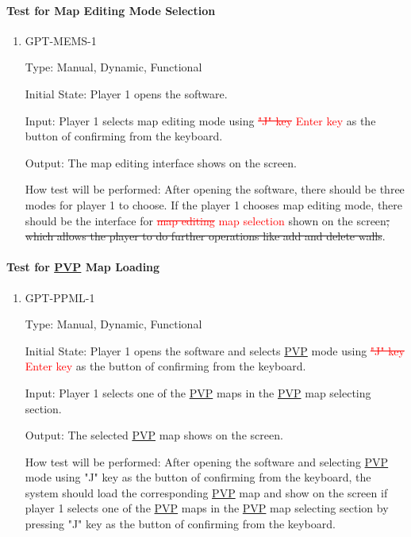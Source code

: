 \documentclass[12pt, titlepage]{article}
\begin{document}
\paragraph{Test for Map Editing Mode Selection}

\begin{enumerate}

\item{GPT-MEMS-1\\}

Type: Manual, Dynamic, Functional
					
Initial State: Player 1 opens the software.
					
Input: Player 1 selects map editing mode using \textcolor{red}{\sout{"J" key}} \textcolor{red}{Enter key} as the button of confirming from the keyboard.
					
Output: The map editing interface shows on the screen.
					
How test will be performed: After opening the software, there should be three modes for player 1 to choose. If the player 1 chooses map editing mode, there should be the interface for \textcolor{red}{\sout{map editing}} \textcolor{red}{map selection} shown on the screen\sout{, which allows the player to do further operations like add and delete walls}.

\end{enumerate}

\paragraph{Test for \underline{PVP} Map Loading}

\begin{enumerate}

\item{GPT-PPML-1\\}

Type: Manual, Dynamic, Functional
					
Initial State: Player 1 opens the software and selects \underline{PVP} mode using \textcolor{red}{\sout{"J" key}} \textcolor{red}{Enter key} as the button of confirming from the keyboard.
					
Input: Player 1 selects one of the \underline{PVP} maps in the \underline{PVP} map selecting section.
					
Output: The selected \underline{PVP} map shows on the screen.
					
How test will be performed: After opening the software and selecting \underline{PVP} mode using "J" key as the button of confirming from the keyboard, the system should load the corresponding \underline{PVP} map and show on the screen if player 1 selects one of the \underline{PVP} maps in the \underline{PVP} map selecting section by pressing "J" key as the button of confirming from the keyboard.

\end{enumerate}
\end{document}
